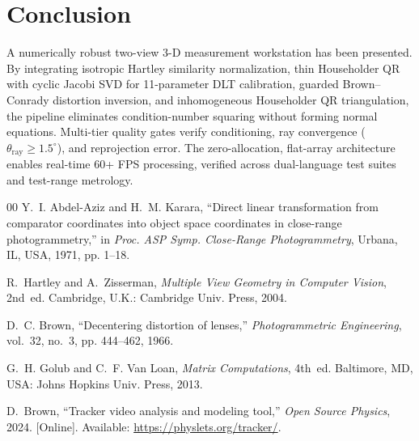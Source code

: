 \documentclass[a4paper,conference]{IEEEtran}
\begin{document}
\section{Conclusion}
A numerically robust two-view 3-D measurement workstation has been presented. By integrating isotropic Hartley similarity normalization, thin Householder QR with cyclic Jacobi SVD for 11-parameter DLT calibration, guarded Brown--Conrady distortion inversion, and inhomogeneous Householder QR triangulation, the pipeline eliminates condition-number squaring without forming normal equations. Multi-tier quality gates verify conditioning, ray convergence ($\theta_{\mathrm{ray}} \ge 1.5^\circ$), and reprojection error. The zero-allocation, flat-array architecture enables real-time 60+ FPS processing, verified across dual-language test suites and test-range metrology.

\begin{thebibliography}{00}
Y.~I. Abdel-Aziz and H.~M. Karara, ``Direct linear transformation from comparator coordinates into object space coordinates in close-range photogrammetry,'' in \emph{Proc. ASP Symp. Close-Range Photogrammetry}, Urbana, IL, USA, 1971, pp. 1--18.

R.~Hartley and A.~Zisserman, \emph{Multiple View Geometry in Computer Vision}, 2nd~ed. Cambridge, U.K.: Cambridge Univ. Press, 2004.

D.~C. Brown, ``Decentering distortion of lenses,'' \emph{Photogrammetric Engineering}, vol.~32, no.~3, pp. 444--462, 1966.

G.~H. Golub and C.~F. Van Loan, \emph{Matrix Computations}, 4th~ed. Baltimore, MD, USA: Johns Hopkins Univ. Press, 2013.

D.~Brown, ``Tracker video analysis and modeling tool,'' \emph{Open Source Physics}, 2024. [Online]. Available: \url{https://physlets.org/tracker/}.
\end{thebibliography}
\end{document}
